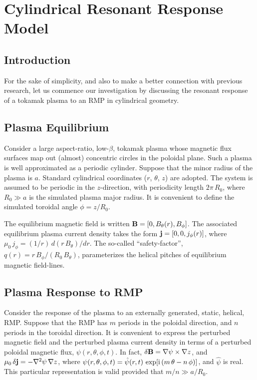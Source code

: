 \documentclass[12pt,prb,aps]{revtex4-1}
\begin{document}
\section{Cylindrical Resonant Response Model}\label{s2}
\subsection{Introduction}
For the sake of simplicity, and also to make a better connection with previous research, let us commence our investigation by discussing
the resonant response of a tokamak plasma to an RMP in cylindrical geometry. 

\subsection{Plasma Equilibrium}
Consider a large aspect-ratio, low-$\beta$, tokamak plasma whose magnetic flux surfaces map out (almost)
concentric circles in the poloidal plane.
Such a plasma is well approximated as a periodic cylinder.  Suppose that the minor radius of the plasma
is $a$. Standard cylindrical coordinates ($r$, $\theta$, $z$) are adopted. The system is assumed to
be periodic in the $z$-direction, with periodicity length $2\pi\,R_0$, where $R_0\gg a$ is the simulated
plasma major radius. It is convenient to define the simulated toroidal angle $\phi=z/R_0$. 

The equilibrium magnetic field is written ${\bf B} = [0,B_\theta(r), B_\phi]$. The associated equilibrium
plasma current density takes the form ${\bf j} =[0,0,j_\phi(r)]$, where $\mu_0\,j_\phi= (1/r)\,d(r\,B_\theta)/dr$. The
so-called ``safety-factor'', $q(r)=r\,B_\phi/(R_0\,B_\theta)$, parameterizes the helical pitches of equilibrium magnetic
field-lines. 

\subsection{Plasma Response to RMP}
Consider the response of the plasma to an externally generated, static, helical, RMP. 
Suppose that the RMP has $m$ periods in the poloidal direction, and $n$ periods in the toroidal direction.
It is convenient to express the perturbed magnetic field and the perturbed plasma current density in
terms of a perturbed poloidal magnetic flux, $\psi(r,\theta,\phi,t)$. In fact, $\delta{\bf B} = \nabla\psi\times \nabla z$, 
and $\mu_0\,\delta {\bf j} = - \nabla^2\psi\,\nabla z$,
where $\psi(r,\theta,\phi,t) = \hat{\psi}(r,t)\,\exp[{\rm i}\,(m\,\theta-n\,\phi)]$, and $\hat{\psi}$ is real. This particular representation
is valid provided that $m/n\gg a/R_0$.\cite{rfa}
\end{document}
